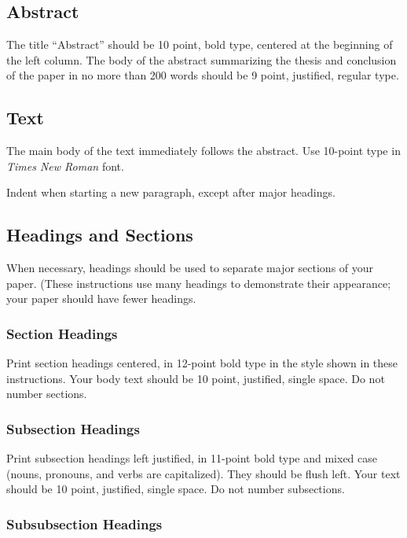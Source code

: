 \documentclass[letterpaper]{article}
\begin{document}
\subsection{Abstract}

The title ``Abstract'' should be 10 point, bold type, centered at the beginning of the left column. The body of the abstract summarizing the thesis and conclusion of the paper in no more than 200 words should be 9 point, justified, regular type.

\subsection{Text}

The main body of the text immediately follows the abstract. Use 10-point type in {\em Times New Roman} font.

Indent when starting a new paragraph, except after major headings. 

\subsection{Headings and Sections}

When necessary, headings should be used to separate major sections of your paper. (These instructions use many headings to demonstrate their appearance; your paper should have fewer headings.

\subsubsection{Section Headings}

Print section headings centered, in 12-point bold type in the style shown in these instructions. Your body text should be 10 point, justified, single space. Do not number sections.

\subsubsection{Subsection Headings}

Print subsection headings left justified, in 11-point bold type and mixed case (nouns, pronouns, and verbs are capitalized). They should be flush left. Your text should be 10 point, justified, single space. Do not number subsections.

\subsubsection{Subsubsection Headings}
\end{document}
